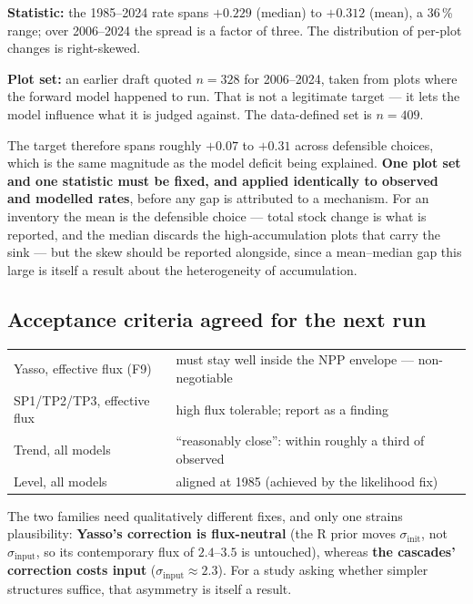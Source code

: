 \documentclass[11pt]{article}
\newcommand{\sinit}{\sigma_{\mathrm{init}}}
\newcommand{\sinput}{\sigma_{\mathrm{input}}}
\begin{document}
\noindent \textbf{Statistic:} the 1985--2024 rate spans $+0.229$ (median) to $+0.312$ (mean), a
36\,\% range; over 2006--2024 the spread is a factor of three. The distribution of per-plot
changes is right-skewed.

\textbf{Plot set:} an earlier draft quoted $n = 328$ for 2006--2024, taken from plots where the
forward model happened to run. That is not a legitimate target --- it lets the model influence
what it is judged against. The data-defined set is $n = 409$.

The target therefore spans roughly $+0.07$ to $+0.31$ across defensible choices, which is the same
magnitude as the model deficit being explained. \textbf{One plot set and one statistic must be
fixed, and applied identically to observed and modelled rates}, before any gap is attributed to a
mechanism. For an inventory the mean is the defensible choice --- total stock change is what is
reported, and the median discards the high-accumulation plots that carry the sink --- but the skew
should be reported alongside, since a mean--median gap this large is itself a result about the
heterogeneity of accumulation.

\subsection{Acceptance criteria agreed for the next run}

\begin{table}[H]\centering\small
\begin{tabular}{ll}
\toprule
Yasso, effective flux (F9) & must stay well inside the NPP envelope --- non-negotiable\\
SP1/TP2/TP3, effective flux & high flux tolerable; report as a finding\\
Trend, all models & ``reasonably close'': within roughly a third of observed\\
Level, all models & aligned at 1985 (achieved by the likelihood fix)\\
\bottomrule
\end{tabular}
\end{table}

\noindent The two families need qualitatively different fixes, and only one strains plausibility:
\textbf{Yasso's correction is flux-neutral} (the R prior moves $\sinit$, not $\sinput$, so its
contemporary flux of $2.4$--$3.5$ is untouched), whereas \textbf{the cascades' correction costs
input} ($\sinput \approx 2.3$). For a study asking whether simpler structures suffice, that
asymmetry is itself a result.
\end{document}
